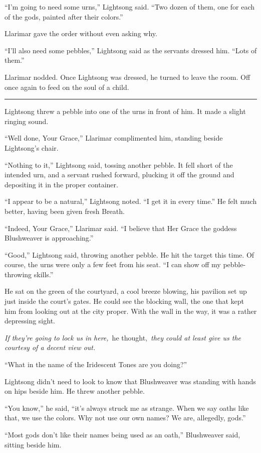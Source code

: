 “I’m going to need some urns,” Lightsong said. “Two dozen of them, one for each of the gods, painted after their colors.”

Llarimar gave the order without even asking why.

“I’ll also need some pebbles,” Lightsong said as the servants dressed him. “Lots of them.”

Llarimar nodded. Once Lightsong was dressed, he turned to leave the room. Off once again to feed on the soul of a child.

\bigskip \hrule \bigskip

Lightsong threw a pebble into one of the urns in front of him. It made a slight ringing sound.

“Well done, Your Grace,” Llarimar complimented him, standing beside Lightsong’s chair.

“Nothing to it,” Lightsong said, tossing another pebble. It fell short of the intended urn, and a servant rushed forward, plucking it off the ground and depositing it in the proper container.

“I appear to be a natural,” Lightsong noted. “I get it in every time.” He felt much better, having been given fresh Breath.

“Indeed, Your Grace,” Llarimar said. “I believe that Her Grace the goddess Blushweaver is approaching.”

“Good,” Lightsong said, throwing another pebble. He hit the target this time. Of course, the urns were only a few feet from his seat. “I can show off my pebble-throwing skills.”

He sat on the green of the courtyard, a cool breeze blowing, his pavilion set up just inside the court’s gates. He could see the blocking wall, the one that kept him from looking out at the city proper. With the wall in the way, it was a rather depressing sight.

\textit{If they’re going to lock us in here,}~he thought,~\textit{they could at least give us the courtesy of a decent view out.}

“What in the name of the Iridescent Tones are you doing?”

Lightsong didn’t need to look to know that Blushweaver was standing with hands on hips beside him. He threw another pebble.

“You know,” he said, “it’s always struck me as strange. When we say oaths like that, we use the colors. Why not use our own names? We are, allegedly, gods.”

“Most gods don’t like their names being used as an oath,” Blushweaver said, sitting beside him.

